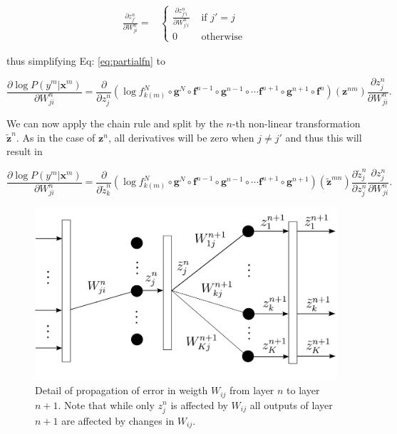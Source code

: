 \begin{align}
\frac{\partial z^n_{j'}}{\partial W_{ji}^n} =  
  &\begin{cases}
   \frac{\partial z^n_{j'i}}{\partial W_{j'i}^n}  &  \mbox{ if } j' = j\\ 
    0    &  \mbox{ otherwise } 
 \end{cases}
\end{align}

\noindent thus simplifying Eq: \ref{eq:partialfn} to

\begin{equation}
\frac{\partial \log P(y^m | \mathbf{x}^m)}{\partial W_{ji}^n} = \frac{\partial}{\partial z^n_{j}} (\log f_{k(m)}^N \circ \mathbf{g}^N \circ \mathbf{f}^{n-1} \circ \mathbf{g}^{n-1} \circ \cdots \mathbf{f}^{n+1} \circ \mathbf{g}^{n+1} \circ \mathbf{f}^{n})(\mathbf{z}^{nm})\frac{\partial z^n_{j}}{\partial W_{ji}^n}.
\label{eq:partialfn2}
\end{equation}

We can now apply the chain rule and split by the $n$-th non-linear transformation $\tilde{\mathbf{z}}^n$. As in the case of $\mathbf{z}^n$, all derivatives will be zero when $j\neq j'$ and thus this will result in

\begin{equation}
\frac{\partial \log P(y^m | \mathbf{x}^m)}{\partial W_{ji}^n} = \frac{\partial}{\partial \tilde{z}^{n}_{k}} (\log f_{k(m)}^N \circ \mathbf{g}^N \circ \mathbf{f}^{n-1} \circ \mathbf{g}^{n-1} \circ \cdots \mathbf{f}^{n+1} \circ \mathbf{g}^{n+1})(\tilde{\mathbf{z}}^{mn})\frac{\partial \tilde{z}^n_{j}}{\partial z_{j}^n}\frac{\partial z^n_{j}}{\partial W_{ji}^n} .
\label{eq:partialfn3}
\end{equation}


\begin{figure}
\centering
\includegraphics[scale=0.4]{figs/deep_learning/LayerP2.pdf}
\caption{Detail of propagation of error in weigth $W_{ij}$ from layer $n$ to layer $n+1$. Note that while only $z_j^n$ is affected by $W_{ij}$ all outputs of layer $n+1$ are affected by changes in $W_{ij}$.}
\label{fig:LayerP2}
\end{figure}

